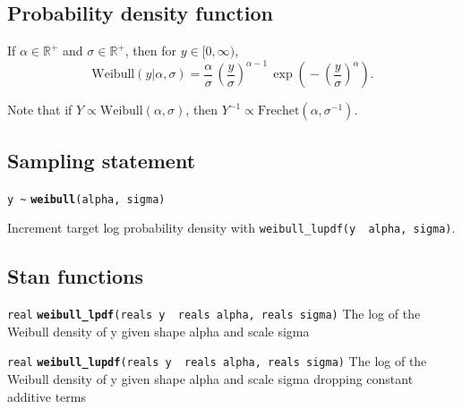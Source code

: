\documentclass[
  10pt,
]{book}
\begin{document}
\hypertarget{probability-density-function-15}{%
\subsection{Probability density function}\label{probability-density-function-15}}

If \(\alpha \in \mathbb{R}^+\) and \(\sigma \in \mathbb{R}^+\), then for
\(y \in [0,\infty)\), \[ \text{Weibull}(y|\alpha,\sigma) =
\frac{\alpha}{\sigma} \, \left( \frac{y}{\sigma} \right)^{\alpha - 1}
\, \exp \! \left( \! - \left( \frac{y}{\sigma} \right)^{\alpha}
\right) . \]

Note that if \(Y \propto \text{Weibull}(\alpha,\sigma)\), then \(Y^{-1} \propto \text{Frechet}(\alpha,\sigma^{-1})\).

\hypertarget{sampling-statement-39}{%
\subsection{Sampling statement}\label{sampling-statement-39}}

\texttt{y\ \textasciitilde{}} \textbf{\texttt{weibull}}\texttt{(alpha,\ sigma)}

Increment target log probability density with \texttt{weibull\_lupdf(y\ \textbar{}\ alpha,\ sigma)}.

\hypertarget{stan-functions-38}{%
\subsection{Stan functions}\label{stan-functions-38}}


\texttt{real} \textbf{\texttt{weibull\_lpdf}}\texttt{(reals\ y\ \textbar{}\ reals\ alpha,\ reals\ sigma)}\newline
The log of the Weibull density of y given shape alpha and scale sigma


\texttt{real} \textbf{\texttt{weibull\_lupdf}}\texttt{(reals\ y\ \textbar{}\ reals\ alpha,\ reals\ sigma)}\newline
The log of the Weibull density of y given shape alpha and scale sigma
dropping constant additive terms

\end{document}
